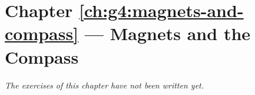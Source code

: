 \section*{Chapter \ref{ch:g4:magnets-and-compass} --- Magnets and the Compass}


\emph{The exercises of this chapter have not been written yet.}
